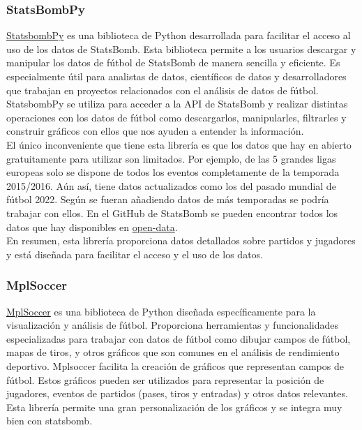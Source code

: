 \subsubsection{StatsBombPy}
\href{https://statsbomb.com/es/}{StatsbombPy} es una biblioteca de Python desarrollada para facilitar el acceso al uso de los datos de StatsBomb. Esta biblioteca permite a los usuarios descargar y manipular los datos de fútbol de StatsBomb de manera sencilla y eficiente. Es especialmente útil para analistas de datos, científicos de datos y desarrolladores que trabajan en proyectos relacionados con el análisis de datos de fútbol. \\
StatsbombPy se utiliza para acceder a la API de StatsBomb y realizar distintas operaciones con los datos de fútbol como descargarlos, manipularles, filtrarles y construir gráficos con ellos que nos ayuden a entender la información. \\
El único inconveniente que tiene esta librería es que los datos que hay en abierto gratuitamente para utilizar son limitados. Por ejemplo, de las 5 grandes ligas europeas solo se dispone de todos los eventos completamente de la temporada 2015/2016. Aún así, tiene datos actualizados como los del pasado mundial de fútbol 2022. Según se fueran añadiendo datos de más temporadas se podría trabajar con ellos. En el GitHub de StatsBomb se pueden encontrar todos los datos que hay disponibles en \href{https://github.com/statsbomb/open-data}{open-data}. \\
En resumen, esta librería proporciona datos detallados sobre partidos y jugadores y está diseñada para facilitar el acceso y el uso de los datos.

\subsubsection{MplSoccer}
\href{https://mplsoccer.readthedocs.io/en/latest/}{MplSoccer} es una biblioteca de Python diseñada específicamente para la visualización y análisis de fútbol. Proporciona herramientas y funcionalidades especializadas para trabajar con datos de fútbol como dibujar campos de fútbol, mapas de tiros, y otros gráficos que son comunes en el análisis de rendimiento deportivo. Mplsoccer facilita la creación de gráficos que representan campos de fútbol. Estos gráficos pueden ser utilizados para representar la posición de jugadores, eventos de partidos (pases, tiros y entradas) y otros datos relevantes. \\
Esta librería permite una gran personalización de los gráficos y se integra muy bien con statsbomb.


